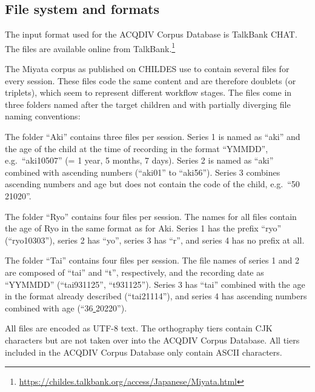 \documentclass[a4paper, 11pt]{book}
\newcommand{\und}{\underline{{ }}\hspace{0.2mm}}	%
\begin{document}
\subsection{File system and formats}
\label{subsec:Miyata file system and formats}

The input format used for the ACQDIV Corpus Database is TalkBank CHAT. The files are available online from TalkBank.\footnote{\url{https://childes.talkbank.org/access/Japanese/Miyata.html}}

The Miyata corpus as published on CHILDES use to contain several files for every session. These files code the same content and are therefore doublets (or triplets), which seem to represent different workflow stages. The files come in three folders named after the target children and with partially diverging file naming conventions: 

\begin{itemize*}
	\item The folder “Aki” contains three files per session. Series 1 is named as “aki” and the age of the child at the time of recording in the format “YMMDD”, 
		e.g.\ “aki10507” (= 1 year, 5 months, 7 days). Series 2 is named as “aki” combined with ascending numbers (“aki01” to “aki56”). Series 3 combines 
		ascending numbers and age but does not contain the code of the child, e.g.\ “50\und 21020”. 
	\item The folder “Ryo” contains four files per session. The names for all files contain the age of Ryo in the same format as for Aki. Series 1 has the 
		prefix “ryo” (“ryo10303”), series 2 has “yo”, series 3 has “r”, and series 4 has no prefix at all. 
	\item The folder “Tai” contains four files per session. The file names of series 1 and 2 are composed of “tai” and “t”, respectively, and the recording date 
		as “YYMMDD” (“tai931125”, “t931125”). Series 3 has “tai” combined with the age in the format already described (“tai21114”), and series 4 has 
		ascending numbers combined with age (“36\und 20220”). 
\end{itemize*}

All files are encoded as UTF-8 text. The orthography tiers contain CJK characters but are not taken over into the ACQDIV Corpus Database. All tiers included in the ACQDIV Corpus Database only contain ASCII characters. 
\end{document}

